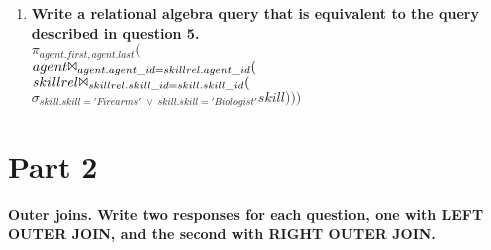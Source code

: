 \documentclass{article}
\begin{document}
\begin{enumerate}
\item
\textbf{Write a relational algebra query that is equivalent to the query described in question 5.\\}
$\pi_{agent.first,agent.last}($\\
$agent \Bowtie_{agent.agent\_id=skillrel.agent\_id} ($\\
$skillrel \Bowtie_{skillrel.skill\_id=skill.skill\_id} ($\\
$\sigma_{skill.skill='Firearms'\; \vee\; skill.skill='Biologist'}skill)))$\\

\end{enumerate}

\section*{Part 2}
\textbf{Outer joins. Write two responses for each question, one with LEFT OUTER JOIN, and the
second with RIGHT OUTER JOIN.}
\end{document}
